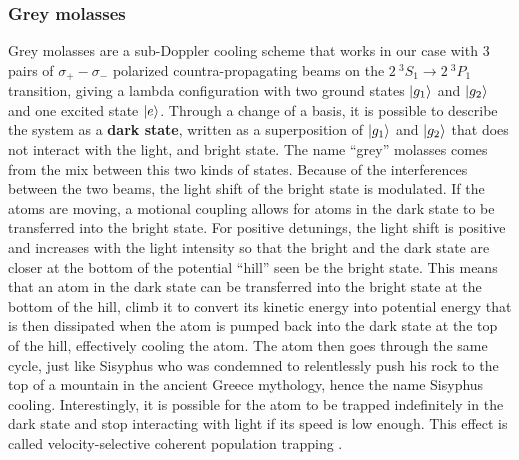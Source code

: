 \subsubsection{Grey molasses}


Grey molasses are a sub-Doppler cooling scheme \cite{cohen1990atomic} that works in our case with 3 pairs of $\sigma_{+} - \sigma_{-}$ polarized countra-propagating beams on the $2 \ ^3 S_1 \rightarrow 2 \ ^3 P_1$ transition, giving a lambda configuration with two ground states $\ket{g_1}$ and $\ket{g_2}$ and one excited state $\ket{e}$. Through a change of a basis, it is possible to describe the system as a \textbf{dark state}, written as a superposition of $\ket{g_1}$ and $\ket{g_2}$ that does not interact with the light, and bright state. The name ``grey'' molasses comes from the mix between this two kinds of states. Because of the interferences between the two beams, the light shift of the bright state is modulated. If the atoms are moving, a motional coupling allows for atoms in the dark state to be transferred into the bright state. For positive detunings, the light shift is positive and increases with the light intensity so that the bright and the dark state are closer at the bottom of the potential ``hill'' seen be the bright state. This means that an atom in the dark state can be transferred into the bright state at the bottom of the hill, climb it to convert its kinetic energy into potential energy that is then dissipated when the atom is pumped back into the dark state at the top of the hill, effectively cooling the atom. The atom then goes through the same cycle, just like Sisyphus who was condemned to relentlessly push his rock to the top of a mountain in the ancient Greece mythology, hence the name Sisyphus cooling. Interestingly, it is possible for the atom to be trapped indefinitely in the dark state and stop interacting with light if its speed is low enough. This effect is called velocity-selective coherent population trapping \cite{aspect1988laser}.


